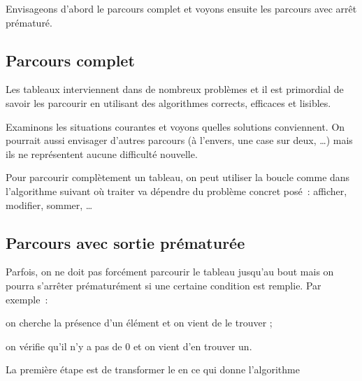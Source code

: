 Envisageons d'abord le parcours complet
et voyons ensuite les parcours avec arrêt prématuré.

\subsection{Parcours complet}

Les tableaux interviennent dans de nombreux problèmes 
et il est primordial de savoir les parcourir 
en utilisant des algorithmes
corrects, efficaces et lisibles.

Examinons les situations courantes et voyons quelles solutions conviennent.
On pourrait aussi envisager d'autres parcours
(à l'envers, une case sur deux, \dots) 
mais ils ne représentent aucune difficulté nouvelle.

Pour parcourir complètement un tableau, 
on peut utiliser la boucle 
comme dans l'algorithme suivant
où \og{}traiter\fg{} va dépendre du problème concret posé~:
afficher, modifier, sommer, \dots


\subsection{Parcours avec sortie prématurée}

Parfois, on ne doit pas forcément parcourir le tableau jusqu'au bout
mais on pourra s'arrêter prématurément si une certaine condition est remplie.
Par exemple~:
\begin{liste}
\item on cherche la présence d'un élément et on vient de le trouver ;
\item on vérifie qu'il n'y a pas de $0$ et on vient d'en trouver un.
\end{liste}

La première étape est de transformer le  en 
ce qui donne l'algorithme 



